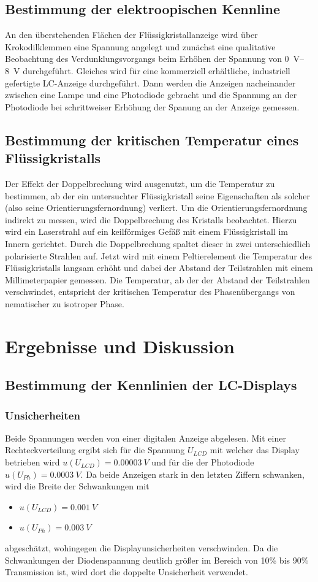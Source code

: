 \documentclass[
	a4paper,
	12pt,
	pagesize,
	ngerman
]{scrartcl}
\begin{document}
	\subsection{Bestimmung der elektroopischen Kennline}
	An den überstehenden Flächen der Flüssigkristallanzeige wird über Krokodilklemmen eine Spannung angelegt und zunächst eine qualitative Beobachtung des Verdunklungsvorgangs beim Erhöhen der Spannung von \SIrange{0}{8}{V} durchgeführt.
	Gleiches wird für eine kommerziell erhältliche, industriell gefertigte LC-Anzeige durchgeführt.
	Dann werden die Anzeigen nacheinander zwischen eine Lampe und eine Photodiode gebracht und die Spannung an der Photodiode bei schrittweiser Erhöhung der Spanung an der Anzeige gemessen.

	\subsection{Bestimmung der kritischen Temperatur eines Flüssigkristalls}
	Der Effekt der Doppelbrechung wird ausgenutzt, um die Temperatur zu bestimmen, ab der ein untersuchter Flüssigkristall seine Eigenschaften als solcher (also seine Orientierungsfernordnung) verliert.
	Um die Orientierungsfernordnung indirekt zu messen, wird die Doppelbrechung des Kristalls beobachtet.
	Hierzu wird ein Laserstrahl auf ein keilförmiges Gefäß mit einem Flüssigkristall im Innern gerichtet.
	Durch die Doppelbrechung spaltet dieser in zwei unterschiedlich polarisierte Strahlen auf.
	Jetzt wird mit einem Peltierelement die Temperatur des Flüssigkristalls langsam erhöht und dabei der Abstand der Teilstrahlen mit einem Millimeterpapier gemessen.
	Die Temperatur, ab der der Abstand der Teilstrahlen verschwindet, entspricht der kritischen Temperatur des Phasenübergangs von nematischer zu isotroper Phase.

	\section{Ergebnisse und Diskussion}
	\subsection{Bestimmung der Kennlinien der LC-Displays}
	\subsubsection{Unsicherheiten}
	Beide Spannungen werden von einer digitalen Anzeige abgelesen.
	Mit einer Rechteckverteilung ergibt sich für die Spannung $U_{LCD}$ mit welcher das Display betrieben wird $u(U_{LCD})=\SI{0.00003}{V}$ und für die der Photodiode $u(U_{Ph})=\SI{0.0003}{V}$.
	Da beide Anzeigen stark in den letzten Ziffern schwanken, wird die Breite der Schwankungen mit
	\begin{itemize}
		\item $u(U_{LCD})=\SI{0.001}{V}$
		\item $u(U_{Ph})=\SI{0.003}{V}$
	\end{itemize}
	abgeschätzt, wohingegen die Displayunsicherheiten verschwinden.
	Da die Schwankungen der Diodenspannung deutlich größer im Bereich von 10\% bis 90\% Transmission ist, wird dort die doppelte Unsicherheit verwendet.
\end{document}
